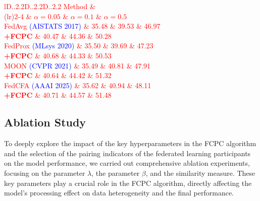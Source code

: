 \documentclass[journal,twoside,web]{ieeecolor}
\newcommand{\rev}[1]{\textcolor{red}{#1}}
\begin{document}
\begin{table}[!t]
\centering
\footnotesize %
\caption{Orthogonality Analysis of FCPC Integration With Existing FL Algorithms (TinyImageNet)}
\label{tab:tinyimagenet}
\rev{
\begin{tabular}{lD{.}{.}{2.2}D{.}{.}{2.2}D{.}{.}{2.2}}
\toprule
Method & \multicolumn{3}{c}{TinyImageNet} \\ %
\cmidrule(lr){2-4}  %
       & \textbf{$\alpha = 0.05$} & \textbf{$\alpha = 0.1$} & \textbf{$\alpha = 0.5$} \\
\midrule
FedAvg {\textcolor{blue}{\scriptsize (AISTATS 2017)}} & 35.48 & 39.53 & 46.97 \\ %
\textbf{  +FCPC} & 40.47 & 44.36 & 50.28 \\
\midrule
FedProx {\textcolor{blue}{\scriptsize (MLsys 2020)}} & 35.50 & 39.69 & 47.23 \\ %
\textbf{  +FCPC} & 40.68 & 44.33 & 50.53 \\
\midrule
MOON {\textcolor{blue}{\scriptsize (CVPR 2021)}} & 35.49 & 40.81 & 47.91 \\ %
\textbf{  +FCPC} & 40.64 & 44.42 & 51.32 \\
\midrule
FedCFA {\textcolor{blue}{\scriptsize (AAAI 2025)}} & 35.62 & 40.94 & 48.11 \\ %
\textbf{  +FCPC} & 40.71 & 44.57 & 51.48 \\
\bottomrule
\end{tabular}
}
\end{table}







\subsection{Ablation Study}

To deeply explore the impact of the key hyperparameters in the FCPC algorithm and the selection of the pairing indicators of the federated learning participants on the model performance, we carried out comprehensive ablation experiments, focusing on the parameter \(\lambda\), the parameter \(\beta\), and the similarity measure. These key parameters play a crucial role in the FCPC algorithm, directly affecting the model's processing effect on data heterogeneity and the final performance.
\end{document}

